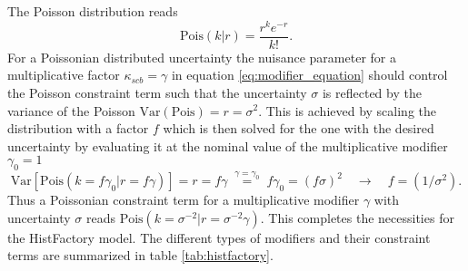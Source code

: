 The Poisson distribution reads
\begin{equation}
    \text{Pois}(k|r)= \frac{r^k e^{-r}}{k!}.
\end{equation}
For a Poissonian distributed uncertainty the nuisance parameter for a multiplicative factor $\kappa_{scb}=\gamma$ in equation \ref{eq:modifier_equation} should control the Poisson constraint term such that the uncertainty $\sigma$ is reflected by the variance of the Poisson $\text{Var}(\text{Pois})=r=\sigma^2$. This is achieved by scaling the distribution with a factor $f$ which is then solved for the one with the desired uncertainty by evaluating it at the nominal value of the multiplicative modifier $\gamma_0=1$
\begin{equation}
    \mathrm{Var}\left[\mathrm{Pois}(k=f\gamma_0 | r=f\gamma)\right]
    =
    r=f\gamma\;\stackrel{\gamma=\gamma_0}{=}\;f\gamma_0=(f\sigma)^2
    \quad
    \rightarrow \quad f=(1/\sigma^2).
\end{equation}
Thus a Poissonian constraint term for a multiplicative modifier $\gamma$ with uncertainty $\sigma$ reads \mbox{$\text{Pois}(k=\sigma^{-2}|r=\sigma^{-2}\gamma)$.} This completes the necessities for the HistFactory model. The different types of modifiers and their constraint terms are summarized in table \ref{tab:histfactory}.
